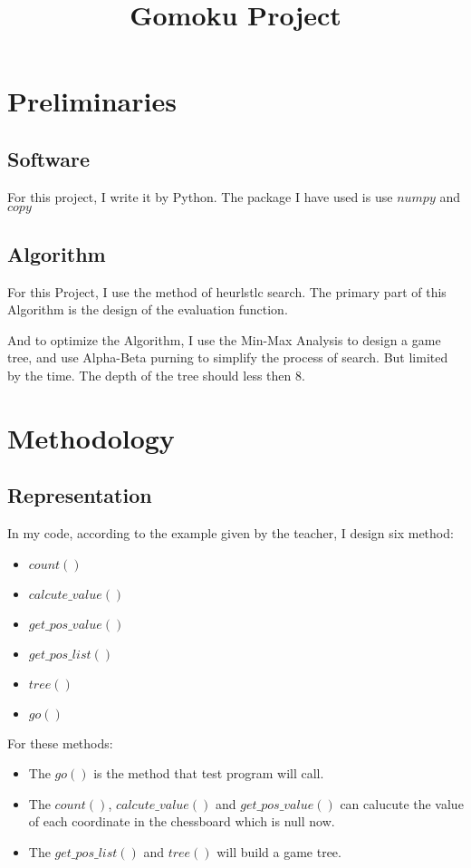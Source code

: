 \documentclass[conference,compsoc]{IEEEtran}
\begin{document}
\title{Gomoku Project}
\author{
}
\maketitle
\IEEEpeerreviewmaketitle



\section{Preliminaries}

\subsection{Software}
For this project, I write it by Python. The package I have used is use $numpy$ and $copy$
\subsection{Algorithm}
For this Project, I use the method of heurlstlc search. The primary part of this Algorithm is the design of the 
evaluation function.  

And to optimize the Algorithm, I use the Min-Max Analysis to design a game tree, and use Alpha-Beta purning to simplify the process of search. 
But limited by the time. The depth of the tree should less then 8.

\section{Methodology}
\subsection{Representation}
In my code, according to the example given by the teacher, I design six method:  
\begin{itemize}
  \item $count()$
  \item $calcute\_value()$
  \item $get\_pos\_value()$
  \item $get\_pos\_list()$
  \item $tree()$
  \item $go()$
\end{itemize}
For these methods:
\begin{itemize}
  \item The $go()$ is the method that test program will call.
  \item The $count()$, $calcute\_value()$ and $get\_pos\_value()$ can calucute the value of each coordinate in the chessboard which is null now.
  \item The $get\_pos\_list()$ and $tree()$ will build a game tree.
\end{itemize}
\end{document}
